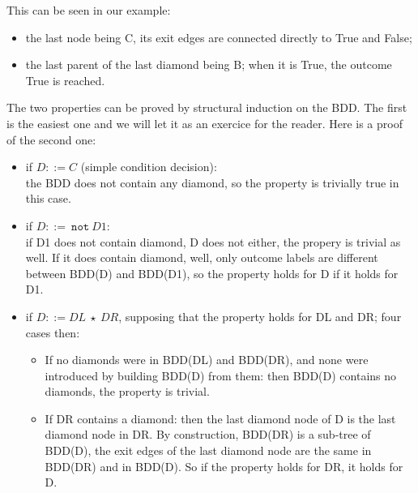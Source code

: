 \documentclass[a4paper,12pt,twoside]{article}
\newcommand{\anysc}{\star}
\newcommand{\adanot}{\texttt{not}}
\begin{document}
This can be seen in our example:
\begin{itemize}
\item the last node being C, its exit edges are connected directly to True and
      False;
\item the last parent of the last diamond being B; when it is True, the outcome
      True is reached.
\end{itemize}

The two properties can be proved by structural induction on the BDD.
The first is the easiest one and we will let it as an exercice for the
reader. Here is a proof of the second one:

\begin{itemize}
\item if $D ::= C$ (simple condition decision):\\
  the BDD does not contain any diamond, so the property is trivially true
  in this case.

\item if $D ::=\ \adanot{} \ D1$:\\
  if D1 does not contain diamond, D does not either, the propery is trivial
  as well. If it does contain diamond, well, only outcome labels are different
  between BDD(D) and BDD(D1), so the property holds for D if it holds for D1.

\item if $D ::= DL \ \anysc{} \ DR$, supposing that the property holds
  for DL and DR; four cases then:

  \begin{itemize}
  \item If no diamonds were in BDD(DL) and BDD(DR), and none were introduced
    by building BDD(D) from them: then BDD(D) contains no diamonds, the
    property is trivial.

  \item If DR contains a diamond: then the last diamond node of D is
    the last diamond node in DR. By construction, BDD(DR) is a
    sub-tree of BDD(D), the exit edges of the last diamond node are
    the same in BDD(DR) and in BDD(D). So if the property holds for
    DR, it holds for D.


\end{itemize}
\end{itemize}
\end{document}
